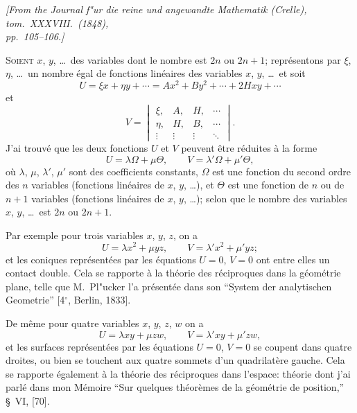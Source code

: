 \documentclass[11pt,a4paper]{article}
\theoremstyle{definition}
\begin{document}
\begin{flushright}
\textit{[From the Journal f"{u}r die reine und angewandte Mathematik (Crelle), tom.\ XXXVIII.\ (1848),\\
pp.\ 105--106.]}
\end{flushright}

\setcounter{page}{421}

\textsc{Soient} $x$, $y$, \ldots\ des variables dont le nombre est $2n$ ou $2n+1$; repr\'{e}sentons par $\xi$, $\eta$, \ldots\ un nombre \'{e}gal de fonctions lin\'{e}aires des variables $x$, $y$, \ldots\ et soit
\[
U = \xi x + \eta y + \cdots = Ax^{2} + By^{2} + \cdots + 2Hxy + \cdots
\]
et
\[
V = \begin{vmatrix}
\xi, & A, & H, & \cdots \\
\eta, & H, & B, & \cdots \\
\vdots & \vdots & \vdots & \ddots
\end{vmatrix}.
\]
J'ai trouv\'{e} que les deux fonctions $U$ et $V$ peuvent \^{e}tre r\'{e}duites \`{a} la forme
\[
U = \lambda\Omega + \mu\Theta, \qquad V = \lambda'\Omega + \mu'\Theta,
\]
o\`{u} $\lambda$, $\mu$, $\lambda'$, $\mu'$ sont des coefficients constants, $\Omega$ est une fonction du second ordre des $n$ variables (fonctions lin\'{e}aires de $x$, $y$, \ldots), et $\Theta$ est une fonction de $n$ ou de $n+1$ variables (fonctions lin\'{e}aires de $x$, $y$, \ldots); selon que le nombre des variables $x$, $y$, \ldots\ est $2n$ ou $2n+1$.

Par exemple pour trois variables $x$, $y$, $z$, on a
\[
U = \lambda x^{2} + \mu yz, \qquad V = \lambda' x^{2} + \mu' yz;
\]
et les coniques repr\'{e}sent\'{e}es par les \'{e}quations $U=0$, $V=0$ ont entre elles un contact double. Cela se rapporte \`{a} la th\'{e}orie des r\'{e}ciproques dans la g\'{e}om\'{e}trie plane, telle que M.~Pl"{u}cker l'a pr\'{e}sent\'{e}e dans son ``System der analytischen Geometrie'' [4$^{\circ}$, Berlin, 1833].

\newpage

\setcounter{page}{422}

De m\^{e}me pour quatre variables $x$, $y$, $z$, $w$ on a
\[
U = \lambda xy + \mu zw, \qquad V = \lambda' xy + \mu' zw,
\]
et les surfaces repr\'{e}sent\'{e}es par les \'{e}quations $U=0$, $V=0$ se coupent dans quatre droites, ou bien se touchent aux quatre sommets d'un quadrilat\`{e}re gauche. Cela se rapporte \'{e}galement \`{a} la th\'{e}orie des r\'{e}ciproques dans l'espace: th\'{e}orie dont j'ai parl\'{e} dans mon M\'{e}moire ``Sur quelques th\'{e}or\`{e}mes de la g\'{e}om\'{e}trie de position,'' \S~VI, [70].
\end{document}
